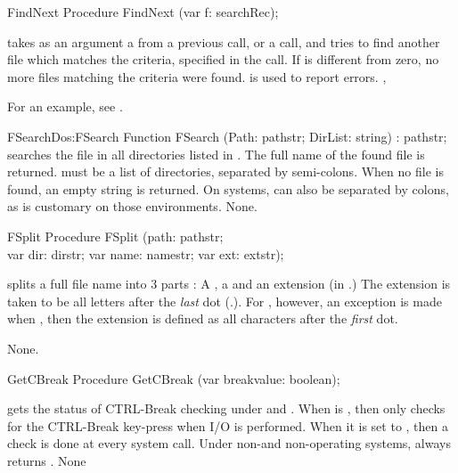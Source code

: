 
\begin{procedure}{FindNext}
\Declaration
Procedure FindNext (var f: searchRec);
\Description

 takes as an argument a  from a previous
 call, or a  call, and tries to find another
file which matches the criteria, specified in the  call.
If  is different from zero, no more files matching the
criteria were found.
\Errors
{} is used to report errors.
\SeeAlso
{}, 
\end{procedure}
For an example, see .
\begin{functionl}{FSearch}{Dos:FSearch}
\Declaration
Function FSearch (Path: pathstr; DirList: string) : pathstr;
\Description
{} searches the file  in all directories listed in
. The full name of the found file is returned.
 must be a list of directories, separated by semi-colons.
When no file is found, an empty string is returned.
\Portability
On \unix systems,  can also be separated by colons, as is
customary on those environments.
\Errors
None.
\SeeAlso
{}
\end{functionl}


 
\begin{procedure}{FSplit}
\Declaration
Procedure FSplit (path: pathstr; \\ var dir: dirstr; var name: namestr;
  var ext: extstr);
\Description

 splits a full file name into 3 parts : A , a
 and an extension  (in .) 
The extension is taken to be all letters after the {\em last} dot (.). For 
\dos, however, an exception is made when , then
the extension is defined as all characters after the {\em first} dot.

\Errors
None.
\SeeAlso
{}
\end{procedure}


\begin{procedure}{GetCBreak}
\Declaration
Procedure GetCBreak (var breakvalue: boolean);
\Description

 gets the status of CTRL-Break checking under \dos and \amiga.
When  is , then \dos only checks for the 
CTRL-Break key-press when I/O is performed. When it is set to ,
then a check is done at every system call.
\Portability
Under non-\dos and non-\amiga operating systems,  always returns 
.
\Errors 
None
\SeeAlso
{}
\end{procedure}

